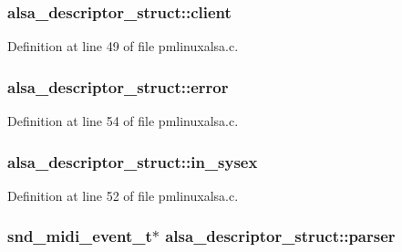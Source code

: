 \subsubsection[{\texorpdfstring{client}{client}}]{ alsa\+\_\+descriptor\+\_\+struct\+::client}\hypertarget{structalsa__descriptor__struct_a5e07931ecedb249e30d2af6bce04d440}{}\label{structalsa__descriptor__struct_a5e07931ecedb249e30d2af6bce04d440}


Definition at line 49 of file pmlinuxalsa.\+c.

\subsubsection[{\texorpdfstring{error}{error}}]{ alsa\+\_\+descriptor\+\_\+struct\+::error}\hypertarget{structalsa__descriptor__struct_a72ee47beba102ffed919a03c7657a087}{}\label{structalsa__descriptor__struct_a72ee47beba102ffed919a03c7657a087}


Definition at line 54 of file pmlinuxalsa.\+c.

\subsubsection[{\texorpdfstring{in\+\_\+sysex}{in_sysex}}]{ alsa\+\_\+descriptor\+\_\+struct\+::in\+\_\+sysex}\hypertarget{structalsa__descriptor__struct_a846e4059a158f06992ddba837d74a4f4}{}\label{structalsa__descriptor__struct_a846e4059a158f06992ddba837d74a4f4}


Definition at line 52 of file pmlinuxalsa.\+c.

\subsubsection[{\texorpdfstring{parser}{parser}}]{\setlength{\rightskip}{0pt plus 5cm}snd\+\_\+midi\+\_\+event\+\_\+t$\ast$ alsa\+\_\+descriptor\+\_\+struct\+::parser}\hypertarget{structalsa__descriptor__struct_a6f4027d2a0dd8eeaeb4d802cc1b10edb}{}\label{structalsa__descriptor__struct_a6f4027d2a0dd8eeaeb4d802cc1b10edb}


